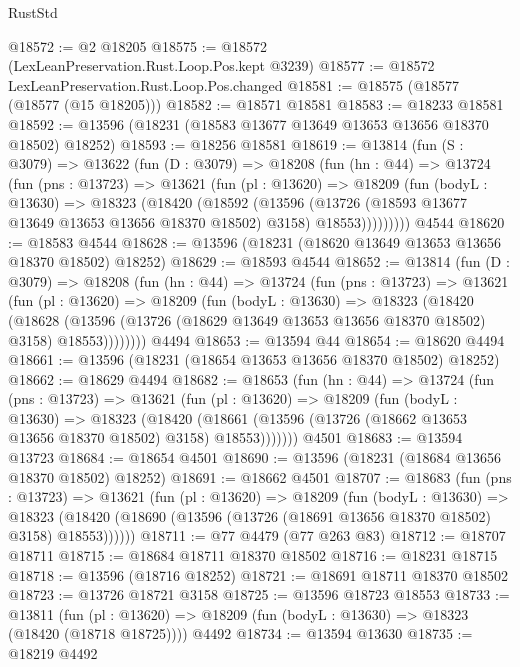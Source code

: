 \begin{lexlean}{RustStd}
\begin{coremodule}
@18572 := @2 @18205
@18575 := @18572 (LexLeanPreservation.Rust.Loop.Pos.kept @3239)
@18577 := @18572 LexLeanPreservation.Rust.Loop.Pos.changed
@18581 := @18575 (@18577 (@18577 (@15 @18205)))
@18582 := @18571 @18581
@18583 := @18233 @18581
@18592 := @13596 (@18231 (@18583 @13677 @13649 @13653 @13656 @18370 @18502) @18252)
@18593 := @18256 @18581
@18619 := @13814
    (fun (S : @3079) =>
    @13622
      (fun (D : @3079) =>
      @18208
        (fun (hn : @44) =>
        @13724
          (fun (pns : @13723) =>
          @13621
            (fun (pl : @13620) =>
            @18209
              (fun (bodyL : @13630) =>
              @18323
                (@18420
                  (@18592
                    (@13596
                      (@13726 (@18593 @13677 @13649 @13653 @13656 @18370 @18502) @3158)
                      @18553)))))))))
    @4544
@18620 := @18583 @4544
@18628 := @13596 (@18231 (@18620 @13649 @13653 @13656 @18370 @18502) @18252)
@18629 := @18593 @4544
@18652 := @13814
    (fun (D : @3079) =>
    @18208
      (fun (hn : @44) =>
      @13724
        (fun (pns : @13723) =>
        @13621
          (fun (pl : @13620) =>
          @18209
            (fun (bodyL : @13630) =>
            @18323
              (@18420
                (@18628
                  (@13596 (@13726 (@18629 @13649 @13653 @13656 @18370 @18502) @3158) @18553))))))))
    @4494
@18653 := @13594 @44
@18654 := @18620 @4494
@18661 := @13596 (@18231 (@18654 @13653 @13656 @18370 @18502) @18252)
@18662 := @18629 @4494
@18682 := @18653
    (fun (hn : @44) =>
    @13724
      (fun (pns : @13723) =>
      @13621
        (fun (pl : @13620) =>
        @18209
          (fun (bodyL : @13630) =>
          @18323
            (@18420
              (@18661 (@13596 (@13726 (@18662 @13653 @13656 @18370 @18502) @3158) @18553)))))))
    @4501
@18683 := @13594 @13723
@18684 := @18654 @4501
@18690 := @13596 (@18231 (@18684 @13656 @18370 @18502) @18252)
@18691 := @18662 @4501
@18707 := @18683
    (fun (pns : @13723) =>
    @13621
      (fun (pl : @13620) =>
      @18209
        (fun (bodyL : @13630) =>
        @18323 (@18420 (@18690 (@13596 (@13726 (@18691 @13656 @18370 @18502) @3158) @18553))))))
@18711 := @77 @4479 (@77 @263 @83)
@18712 := @18707 @18711
@18715 := @18684 @18711 @18370 @18502
@18716 := @18231 @18715
@18718 := @13596 (@18716 @18252)
@18721 := @18691 @18711 @18370 @18502
@18723 := @13726 @18721 @3158
@18725 := @13596 @18723 @18553
@18733 := @13811
    (fun (pl : @13620) => @18209 (fun (bodyL : @13630) => @18323 (@18420 (@18718 @18725))))
    @4492
@18734 := @13594 @13630
@18735 := @18219 @4492

\end{coremodule}
\end{lexlean}
